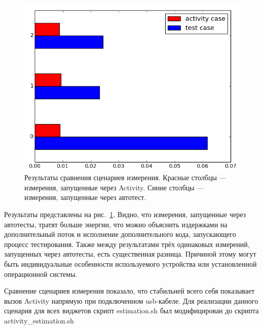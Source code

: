 \documentclass[a4paper,14pt]{extarticle} %
\begin{document}
	\begin{figure}[tbh]
		\includegraphics[width=\textwidth]{test_comparation}
		\caption{Результаты сравнения  сценариев измерения. Красные столбцы --- измерения, запущенные через Activity. Синие столбцы --- измерения, запущенные через автотест.}
		\label{fig:test_comparation}
	\end{figure}

	Результаты представлены на рис.~\ref{fig:test_comparation}. Видно, что измерения, запущенные через автотесты, тратят больше энергии, что можно объяснить издержками на дополнительный поток и исполнение дополнительного кода, запускающего процесс тестирования. Также между результатами трёх одинаковых измерений, запущенных через автотесты, есть существенная разница. Причиной этому могут быть индивидуальные особенности используемого устройства или установленной операционной системы.
	
	Сравнение сценариев измерения показало, что стабильней всего себя показывает вызов Activity напрямую при подключенном usb-кабеле. Для реализации данного сценария для всех виджетов скрипт estimation.sh был модифицирован до скрипта activity\_estimation.sh~\ris{\ref{fig:activity_estimation}}
	
\end{document}
